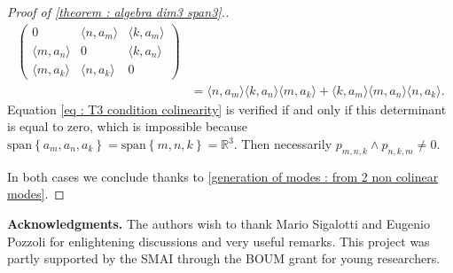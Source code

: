 \documentclass[10pt]{article}
\newcommand{\R}{{\mathbb R}}
\newcommand{\la}{\langle}
\newcommand{\ra}{\rangle}
\newcommand{\we}{\wedge}
\begin{document}
\begin{proof}[Proof of \cref{theorem : algebra dim3 span3}.]
\begin{align*}
\begin{pmatrix}
            0& \la n,a_m\ra & \la k,a_m\ra \\
            \la m,a_n \ra & 0 & \la k,a_n \ra \\
            \la m,a_k \ra & \la n,a_k \ra & 0
        \end{pmatrix} \\
        &=\la n,a_m\ra \la k,a_n \ra \la m,a_k \ra + \la k,a_m \ra \la m,a_n \ra \la n,a_k \ra.
    \end{align*}
    Equation \eqref{eq : T3 condition colinearity} is verified if and only if this determinant is equal to zero, which is impossible because $\mathrm{span}\left\{a_m,a_n,a_k\right\}=\mathrm{span}\left\{m,n,k\right\}=\R^3$. Then necessarily $p_{m,n,k}\we p_{n,k,m}\neq 0$. 
    
    In both cases we conclude thanks to \cref{generation of modes : from 2 non colinear modes}.
    \end{proof}

\noindent \textbf{Acknowledgments.} The authors wish to thank Mario Sigalotti and Eugenio Pozzoli for enlightening discussions and very useful remarks. This project was partly supported by the SMAI through the BOUM grant for young researchers.
    
\end{document}

